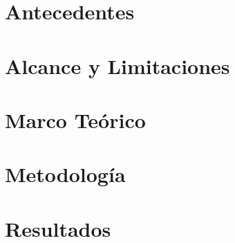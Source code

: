 \documentclass[10pt, letterpaper]{report}
\newcommand{\defaultparformat}[1]{
	{\setlength{\parskip}{2ex}
    }
}
\begin{document}
\ifdefined\CAPantecedentes
	\newpage
	\chapter{Antecedentes}
	\ifdefined\parpordefecto
    	\defaultparformat{antecedentes}
    \else
    	
    \fi  
\fi

\ifdefined\CAPalcance
	\newpage
	\chapter{Alcance y Limitaciones}
	\ifdefined\parpordefecto
    	\defaultparformat{alcance}
    \else
    	
    \fi 
\fi

\ifdefined\CAPmarcoteorico
	\newpage
	\chapter{Marco Teórico}
	\ifdefined\parpordefecto
		\defaultparformat{marco_teorico}
	\else
		
	\fi
\fi

\ifdefined\CAPmarcoteorico
	\newpage
	\chapter{Metodología}
	\ifdefined\parpordefecto
		\defaultparformat{metodologia}
	\else
		
	\fi
\fi

\ifdefined\CAPresultados
	\newpage
	\chapter{Resultados}
	\ifdefined\parpordefecto
    	\defaultparformat{Resultados}
    \else
    	
    \fi  
\fi
\end{document}
